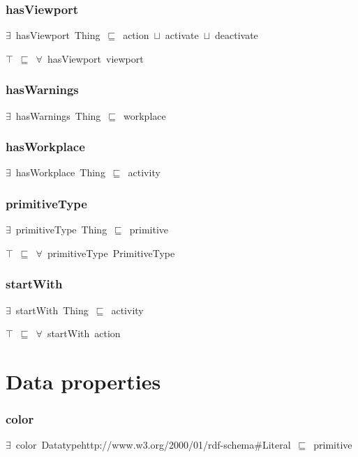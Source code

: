 \documentclass{article}
\begin{document}
\subsubsection*{hasViewport}

\ensuremath{\exists}~hasViewport~Thing~\ensuremath{\sqsubseteq}~action~\ensuremath{\sqcup}~activate~\ensuremath{\sqcup}~deactivate

\ensuremath{\top}~\ensuremath{\sqsubseteq}~\ensuremath{\forall}~hasViewport~viewport

\subsubsection*{hasWarnings}

\ensuremath{\exists}~hasWarnings~Thing~\ensuremath{\sqsubseteq}~workplace

\subsubsection*{hasWorkplace}

\ensuremath{\exists}~hasWorkplace~Thing~\ensuremath{\sqsubseteq}~activity

\subsubsection*{primitiveType}

\ensuremath{\exists}~primitiveType~Thing~\ensuremath{\sqsubseteq}~primitive

\ensuremath{\top}~\ensuremath{\sqsubseteq}~\ensuremath{\forall}~primitiveType~PrimitiveType

\subsubsection*{startWith}

\ensuremath{\exists}~startWith~Thing~\ensuremath{\sqsubseteq}~activity

\ensuremath{\top}~\ensuremath{\sqsubseteq}~\ensuremath{\forall}~startWith~action

\section*{Data properties}\subsubsection*{color}

\ensuremath{\exists}~color~Datatypehttp://www.w3.org/2000/01/rdf-schema#Literal~\ensuremath{\sqsubseteq}~primitive
\end{document}

